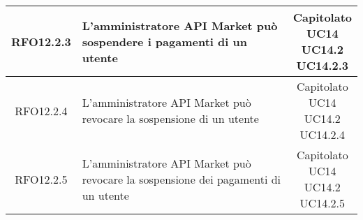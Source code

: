 \begin{longtable}{|c|p{8cm}|c|}
\hypertarget{RFO12.2.3}{RFO12.2.3} & L'amministratore API Market può sospendere i pagamenti di un utente & \makecell*{Capitolato\\UC14\\UC14.2\\UC14.2.3} \\
\hline

\hypertarget{RFO12.2.4}{RFO12.2.4} & L'amministratore API Market può revocare la sospensione di un utente & \makecell*{Capitolato\\UC14\\UC14.2\\UC14.2.4} \\
\hline

\hypertarget{RFO12.2.5}{RFO12.2.5} & L'amministratore API Market può revocare la sospensione dei pagamenti di un utente & \makecell*{Capitolato\\UC14\\UC14.2\\UC14.2.5} \\
\hline


\end{longtable}

